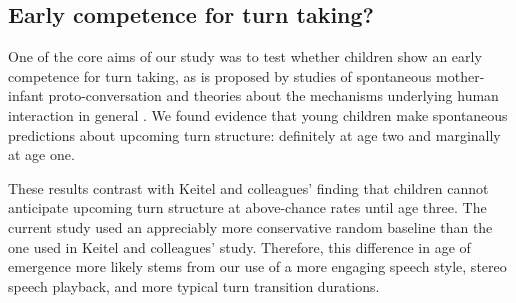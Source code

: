 \documentclass[authoryear, 12pt]{elsarticle}
\begin{document}


\subsection{Early competence for turn taking?}

One of the core aims of our study was to test whether children show an early competence for turn taking, as is proposed by studies of spontaneous mother-infant proto-conversation and theories about the mechanisms underlying human interaction in general \citep{hilbrink2015, levinson2006}. We found evidence that young children make spontaneous predictions about upcoming turn structure: definitely at age two and marginally at age one.

These results contrast with Keitel and colleagues' \citeyearpar{keitel2013} finding that children cannot anticipate upcoming turn structure at above-chance rates until age three. The current study used an appreciably more conservative random baseline than the one used in Keitel and colleagues' study. Therefore, this difference in age of emergence more likely stems from our use of a more engaging speech style, stereo speech playback, and more typical turn transition durations.
\end{document}
